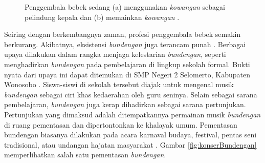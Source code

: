 \begin{figure}[t!]
    \centering     %
    \hspace{1cm}
    \caption{Penggembala bebek sedang (a) menggunakan \textit{kowangan} sebagai pelindung kepala dan (b) memainkan \textit{kowangan}  \cite{kunst}.}
    \label{fig:kowanganKunst}
\end{figure}
\newpage
Seiring dengan berkembangnya zaman, profesi penggembala bebek semakin berkurang. Akibatnya, eksistensi \textit{bundengan} juga terancam punah \cite{prosidingDirektivitas}. Berbagai upaya dilakukan dalam rangka menjaga kelestarian \textit{bundengan}, seperti menghadirkan \textit{bundengan} pada pembelajaran di lingkup sekolah formal. Bukti nyata dari upaya ini dapat ditemukan di SMP Negeri 2 Selomerto, Kabupaten Wonosobo \cite{skripsiSaid}. Siswa-siswi di sekolah tersebut diajak untuk mengenal musik \textit{bundengan} sebagai ciri khas kedaerahan oleh guru seninya. Selain sebagai sarana pembelajaran, \textit{bundengan} juga kerap dihadirkan sebagai sarana pertunjukan. Pertunjukan yang dimaksud adalah ditempatkannya permainan musik \textit{bundengan} di ruang pementasan dan dipertontonkan ke khalayak umum. Pementasan bundengan biasanya dilakukan pada acara karnaval budaya, festival, pentas seni tradisional, atau undangan hajatan masyarakat \cite{skripsiSaid}. Gambar \ref{fig:konserBundengan} memperlihatkan salah satu pementasan \textit{bundengan}. \par
